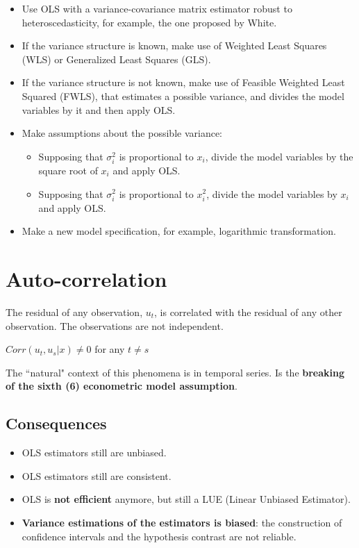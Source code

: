 \documentclass[10pt, a4paper, landscape]{extarticle}
\begin{document}
\begin{multicols}{3}
\begin{itemize}[leftmargin=*]
\item Use OLS with a variance-covariance matrix estimator robust to heteroscedasticity, for example, the one proposed by White.
\item If the variance structure is known, make use of Weighted Least Squares (WLS) or Generalized Least Squares (GLS).
\item If the variance structure is not known, make use of Feasible Weighted Least Squared (FWLS), that estimates a possible variance, and divides the model variables by it and then apply OLS.
\item Make assumptions about the possible variance:
\begin{itemize}[leftmargin=*]
\item Supposing that $\sigma_i^2$ is proportional to $x_i$, divide the model variables by the square root of $x_i$ and apply OLS.
\item Supposing that $\sigma_i^2$ is proportional to $x_i^2$, divide the model variables by $x_i$ and apply OLS.
\end{itemize}
\item Make a new model specification, for example, logarithmic transformation.
\end{itemize}

\columnbreak

\section*{Auto-correlation}

The residual of any observation, $u_t$, is correlated with the residual of any other observation. The observations are not independent.

\begin{center}
$Corr(u_t, u_s | x) \neq 0$ for any $t \neq s$
\end{center}

The ``natural" context of this phenomena is in temporal series. Is the \textbf{breaking of the sixth (6) econometric model assumption}.

\subsection*{Consequences}

\begin{itemize}[leftmargin=*]
\item OLS estimators still are unbiased.
\item OLS estimators still are consistent.
\item OLS is \textbf{not efficient} anymore, but still a LUE (Linear Unbiased Estimator).
\item \textbf{Variance estimations of the estimators is biased}: the construction of confidence intervals and the hypothesis contrast are not reliable.
\end{itemize}


\end{multicols}
\end{document}
